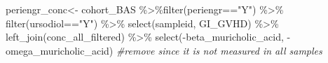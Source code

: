 \documentclass[
]{book}
\newenvironment{Shaded}{\begin{snugshade}}{\end{snugshade}}
\newcommand{\AttributeTok}[1]{\textcolor[rgb]{0.77,0.63,0.00}{#1}}
\newcommand{\CommentTok}[1]{\textcolor[rgb]{0.56,0.35,0.01}{\textit{#1}}}
\newcommand{\FunctionTok}[1]{\textcolor[rgb]{0.00,0.00,0.00}{#1}}
\newcommand{\NormalTok}[1]{#1}
\newcommand{\OtherTok}[1]{\textcolor[rgb]{0.56,0.35,0.01}{#1}}
\newcommand{\SpecialCharTok}[1]{\textcolor[rgb]{0.00,0.00,0.00}{#1}}
\newcommand{\StringTok}[1]{\textcolor[rgb]{0.31,0.60,0.02}{#1}}
\begin{document}
\begin{Shaded}
\begin{Highlighting}[]
\NormalTok{periengr\_conc}\OtherTok{\textless{}{-}}\NormalTok{ cohort\_BAS }\SpecialCharTok{\%\textgreater{}\%}\FunctionTok{filter}\NormalTok{(periengr}\SpecialCharTok{==}\StringTok{"Y"}\NormalTok{) }\SpecialCharTok{\%\textgreater{}\%} 
  \FunctionTok{filter}\NormalTok{(ursodiol}\SpecialCharTok{==}\StringTok{"Y"}\NormalTok{) }\SpecialCharTok{\%\textgreater{}\%} 
  \FunctionTok{select}\NormalTok{(sampleid, GI\_GVHD) }\SpecialCharTok{\%\textgreater{}\%} 
  \FunctionTok{left\_join}\NormalTok{(conc\_all\_filtered) }\SpecialCharTok{\%\textgreater{}\%} 
  \FunctionTok{select}\NormalTok{(}\SpecialCharTok{{-}}\StringTok{\textasciigrave{}}\AttributeTok{beta\_muricholic\_acid}\StringTok{\textasciigrave{}}\NormalTok{, }\SpecialCharTok{{-}}\StringTok{\textasciigrave{}}\AttributeTok{omega\_muricholic\_acid}\StringTok{\textasciigrave{}}\NormalTok{) }\CommentTok{\#remove since it is not measured in all samples}


\end{Highlighting}
\end{Shaded}
\end{document}
